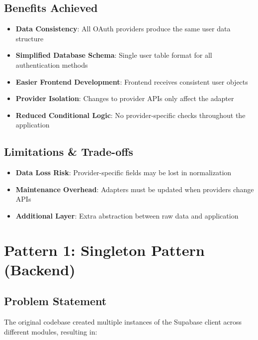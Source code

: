 \documentclass[a4paper,12pt]{report}
\begin{document}
\subsection{Benefits Achieved}

\begin{itemize}
    \item \textbf{Data Consistency}: All OAuth providers produce the same user data structure
    \item \textbf{Simplified Database Schema}: Single user table format for all authentication methods
    \item \textbf{Easier Frontend Development}: Frontend receives consistent user objects
    \item \textbf{Provider Isolation}: Changes to provider APIs only affect the adapter
    \item \textbf{Reduced Conditional Logic}: No provider-specific checks throughout the application
\end{itemize}

\subsection{Limitations \& Trade-offs}

\begin{itemize}
    \item \textbf{Data Loss Risk}: Provider-specific fields may be lost in normalization
    \item \textbf{Maintenance Overhead}: Adapters must be updated when providers change APIs
    \item \textbf{Additional Layer}: Extra abstraction between raw data and application
\end{itemize}








\section{Pattern 1: Singleton Pattern (Backend)}

\subsection{Problem Statement}

The original codebase created multiple instances of the Supabase client across different modules, resulting in:
\end{document}
